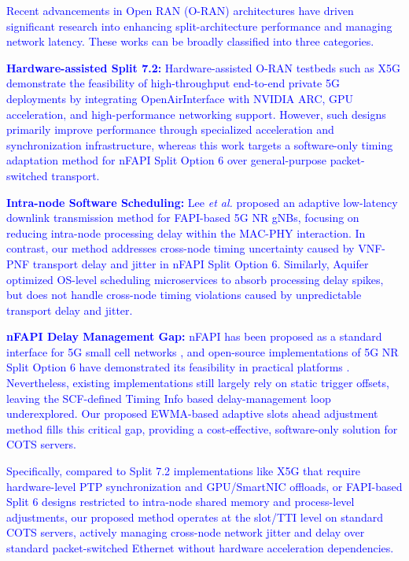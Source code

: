 \documentclass[10pt, conference, letterpaper]{IEEEtran}
\begin{document}
\textcolor{blue}{Recent advancements in Open RAN (O-RAN) architectures have driven significant research into enhancing split-architecture performance and managing network latency. These works can be broadly classified into three categories.}

\textcolor{blue}{\textbf{Hardware-assisted Split 7.2:} Hardware-assisted O-RAN testbeds such as X5G \cite{Villa2025} demonstrate the feasibility of high-throughput end-to-end private 5G deployments by integrating OpenAirInterface with NVIDIA ARC, GPU acceleration, and high-performance networking support. However, such designs primarily improve performance through specialized acceleration and synchronization infrastructure, whereas this work targets a software-only timing adaptation method for nFAPI Split Option 6 over general-purpose packet-switched transport.}

\textcolor{blue}{\textbf{Intra-node Software Scheduling:} Lee \textit{et al.} \cite{Lee2022} proposed an adaptive low-latency downlink transmission method for FAPI-based 5G NR gNBs, focusing on reducing intra-node processing delay within the MAC-PHY interaction. In contrast, our method addresses cross-node timing uncertainty caused by VNF-PNF transport delay and jitter in nFAPI Split Option 6. Similarly, Aquifer \cite{Aquifer2024} optimized OS-level scheduling microservices to absorb processing delay spikes, but does not handle cross-node timing violations caused by unpredictable transport delay and jitter.}

\textcolor{blue}{\textbf{nFAPI Delay Management Gap:} nFAPI has been proposed as a standard interface for 5G small cell networks \cite{Douros2018}, and open-source implementations of 5G NR Split Option 6 have demonstrated its feasibility in practical platforms \cite{Wang2022}. Nevertheless, existing implementations still largely rely on static trigger offsets, leaving the SCF-defined Timing Info based delay-management loop underexplored. Our proposed EWMA-based adaptive slots ahead adjustment method fills this critical gap, providing a cost-effective, software-only solution for COTS servers.}

\textcolor{blue}{Specifically, compared to Split 7.2 implementations like X5G \cite{Villa2025} that require hardware-level PTP synchronization and GPU/SmartNIC offloads, or FAPI-based Split 6 designs \cite{Lee2022} restricted to intra-node shared memory and process-level adjustments, our proposed method operates at the slot/TTI level on standard COTS servers, actively managing cross-node network jitter and delay over standard packet-switched Ethernet without hardware acceleration dependencies.}
\end{document}
